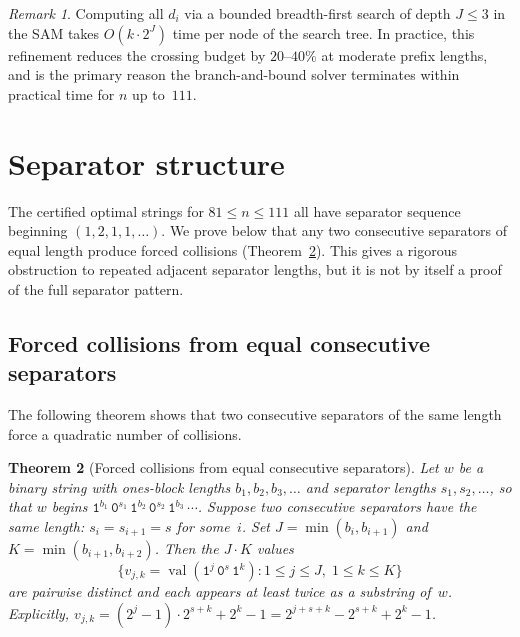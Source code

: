 \documentclass[11pt,a4paper]{article}
\theoremstyle{plain}
\newtheorem{theorem}{Theorem}[section]
\theoremstyle{definition}
\theoremstyle{remark}
\newtheorem{remark}[theorem]{Remark}
\newcommand{\val}{\operatorname{val}}
\begin{document}
\begin{remark}
  Computing all $d_i$ via a bounded breadth-first search of depth
  $J \le 3$ in the SAM takes $O(k \cdot 2^J)$ time per node of the
  search tree.  In practice, this refinement reduces the crossing
  budget by $20$--$40\%$ at moderate prefix lengths, and is the
  primary reason the branch-and-bound solver terminates within
  practical time for $n$ up to~$111$.
\end{remark}

\section{Separator structure}\label{sec:separator}

The certified optimal strings for $81 \le n \le 111$ all have
separator sequence beginning $(1,2,1,1,\ldots)$.  We prove below that
any two consecutive separators of equal length produce forced
collisions (Theorem~\ref{thm:sep2-collisions}).  This gives a rigorous
obstruction to repeated adjacent separator lengths, but it is not by
itself a proof of the full separator pattern.

\subsection{Forced collisions from equal consecutive separators}

The following theorem shows that two consecutive separators of the
same length force a quadratic number of collisions.

\begin{theorem}[Forced collisions from equal consecutive separators]
\label{thm:sep2-collisions}
  Let $w$ be a binary string with ones-block lengths
  $b_1, b_2, b_3, \ldots$ and separator lengths $s_1, s_2, \ldots$,
  so that $w$ begins
  $\mathtt{1}^{b_1}\,\mathtt{0}^{s_1}\,\mathtt{1}^{b_2}\,
   \mathtt{0}^{s_2}\,\mathtt{1}^{b_3}\,\cdots$.
  Suppose two consecutive separators have the same length:
  $s_i = s_{i+1} = s$ for some~$i$.  Set
  $J = \min(b_i, b_{i+1})$ and $K = \min(b_{i+1}, b_{i+2})$.  Then the
  $J \cdot K$ values
  \[
    \bigl\{v_{j,k} = \val(\mathtt{1}^j\,\mathtt{0}^s\,\mathtt{1}^k) :
    1 \le j \le J,\; 1 \le k \le K\bigr\}
  \]
  are pairwise distinct and each appears at least twice as a
  substring of~$w$.  Explicitly,
  $v_{j,k} = (2^j - 1)\cdot 2^{s+k} + 2^k - 1 = 2^{j+s+k} - 2^{s+k} + 2^k - 1$.
\end{theorem}
\end{document}
